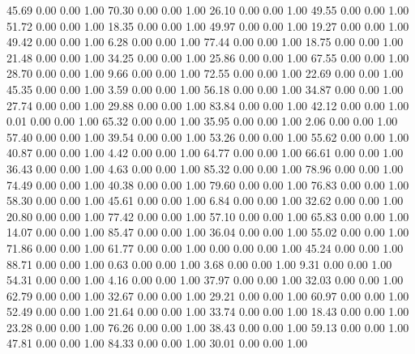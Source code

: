    45.69   0.00   0.00   1.00
   70.30   0.00   0.00   1.00
   26.10   0.00   0.00   1.00
   49.55   0.00   0.00   1.00
   51.72   0.00   0.00   1.00
   18.35   0.00   0.00   1.00
   49.97   0.00   0.00   1.00
   19.27   0.00   0.00   1.00
   49.42   0.00   0.00   1.00
    6.28   0.00   0.00   1.00
   77.44   0.00   0.00   1.00
   18.75   0.00   0.00   1.00
   21.48   0.00   0.00   1.00
   34.25   0.00   0.00   1.00
   25.86   0.00   0.00   1.00
   67.55   0.00   0.00   1.00
   28.70   0.00   0.00   1.00
    9.66   0.00   0.00   1.00
   72.55   0.00   0.00   1.00
   22.69   0.00   0.00   1.00
   45.35   0.00   0.00   1.00
    3.59   0.00   0.00   1.00
   56.18   0.00   0.00   1.00
   34.87   0.00   0.00   1.00
   27.74   0.00   0.00   1.00
   29.88   0.00   0.00   1.00
   83.84   0.00   0.00   1.00
   42.12   0.00   0.00   1.00
    0.01   0.00   0.00   1.00
   65.32   0.00   0.00   1.00
   35.95   0.00   0.00   1.00
    2.06   0.00   0.00   1.00
   57.40   0.00   0.00   1.00
   39.54   0.00   0.00   1.00
   53.26   0.00   0.00   1.00
   55.62   0.00   0.00   1.00
   40.87   0.00   0.00   1.00
    4.42   0.00   0.00   1.00
   64.77   0.00   0.00   1.00
   66.61   0.00   0.00   1.00
   36.43   0.00   0.00   1.00
    4.63   0.00   0.00   1.00
   85.32   0.00   0.00   1.00
   78.96   0.00   0.00   1.00
   74.49   0.00   0.00   1.00
   40.38   0.00   0.00   1.00
   79.60   0.00   0.00   1.00
   76.83   0.00   0.00   1.00
   58.30   0.00   0.00   1.00
   45.61   0.00   0.00   1.00
    6.84   0.00   0.00   1.00
   32.62   0.00   0.00   1.00
   20.80   0.00   0.00   1.00
   77.42   0.00   0.00   1.00
   57.10   0.00   0.00   1.00
   65.83   0.00   0.00   1.00
   14.07   0.00   0.00   1.00
   85.47   0.00   0.00   1.00
   36.04   0.00   0.00   1.00
   55.02   0.00   0.00   1.00
   71.86   0.00   0.00   1.00
   61.77   0.00   0.00   1.00
   0.00   0.00   0.00   1.00
   45.24   0.00   0.00   1.00
   88.71   0.00   0.00   1.00
    0.63   0.00   0.00   1.00
    3.68   0.00   0.00   1.00
    9.31   0.00   0.00   1.00
   54.31   0.00   0.00   1.00
    4.16   0.00   0.00   1.00
   37.97   0.00   0.00   1.00
   32.03   0.00   0.00   1.00
   62.79   0.00   0.00   1.00
   32.67   0.00   0.00   1.00
   29.21   0.00   0.00   1.00
   60.97   0.00   0.00   1.00
   52.49   0.00   0.00   1.00
   21.64   0.00   0.00   1.00
   33.74   0.00   0.00   1.00
   18.43   0.00   0.00   1.00
   23.28   0.00   0.00   1.00
   76.26   0.00   0.00   1.00
   38.43   0.00   0.00   1.00
   59.13   0.00   0.00   1.00
   47.81   0.00   0.00   1.00
   84.33   0.00   0.00   1.00
   30.01   0.00   0.00   1.00
